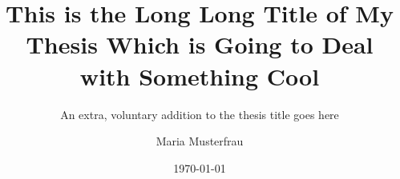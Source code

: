 \documentclass[%
  bachelor,%
  draft,%
  english,%
  ngerman,%
  female,%
]{iswstud}
\author{Maria Musterfrau}
\date{\today}
\title{This is the Long Long Title of My Thesis Which is Going to Deal with Something Cool}
\subtitle{An extra, voluntary addition to the thesis title goes here}
\begin{document}
\frontmatter


\maketitle



\begin{otherlanguage}{english}
 \maketitle
\end{otherlanguage}



\begin{abstract}
  \Blindtext[3]
  
\end{abstract}



\begin{otherlanguage}{english}
  \begin{abstract}
    \Blindtext[3]

    \draftname
       
  \end{abstract}
\end{otherlanguage}



\end{document}
